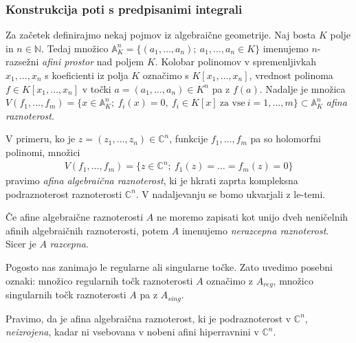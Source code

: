 \documentclass[12pt,a4paper,twoside]{article}
\theoremstyle{definition} %
\theoremstyle{plain} %
\numberwithin{equation}{section}  %
\begin{document}
\subsubsection{Konstrukcija poti s predpisanimi integrali}
%
Za začetek definirajmo nekaj pojmov iz algebraične geometrije. \newline
Naj bosta $K$ polje in $n \in \mathbb{N}$. Tedaj množico $\mathbb{A}_{K}^{n} = \{ (a_{1}, \dots , a_{n}); \ a_{1}, \dots , a_{n} \in K \}$ imenujemo $n$-razsežni \emph{afini prostor} nad poljem $K$.
Kolobar polinomov v spremenljivkah $x_{1}, \dots , x_{n}$ s koeficienti iz polja $K$ označimo s $K[x_{1}, \dots , x_{n}]$, vrednost polinoma $f \in K[x_{1}, \dots , x_{n}]$ v točki $a = (a_{1}, \dots , a_{n}) \in K^{n}$ pa z $f(a)$.
Nadalje je množica $V(f_{1}, \dots , f_{m}) = \{ x \in \mathbb{A}_{K}^{n} ; \ f_{i}(x) = 0, \ f_{i} \in K[x] \ \textrm{za vse} \ i = 1, \dots , m \} \subset \mathbb{A}_{K}^{n}$ \emph{afina raznoterost}.

V primeru, ko je $z = (z_{1}, \dots , z_{n}) \in \mathbb{C}^{n}$, funkcije $f_{1}, \dots , f_{m}$ pa so holomorfni polinomi, množici
\begin{gather}
V(f_{1}, \dots , f_{m}) = \{ z \in \mathbb{C}^{n}; \ f_{1}(z) = \dots = f_{m}(z) = 0 \}
\end{gather}
pravimo \emph{afina algebraična raznoterost}, ki je hkrati zaprta kompleksna podraznoterost raznoterosti $\mathbb{C}^{n}$.
V nadaljevanju se bomo ukvarjali z le-temi.

Če afine algebraične raznoterosti $A$ ne moremo zapisati kot unijo dveh neničelnih afinih algebraičnih raznoterosti, potem $A$ imenujemo \emph{nerazcepna raznoterost}.
Sicer je $A$ \emph{razcepna}.

Pogosto nas zanimajo le regularne ali singularne točke. Zato uvedimo posebni oznaki:
množico regularnih točk raznoterosti $A$ označimo z $A_{reg}$, množico singularnih točk raznoterosti $A$ pa z $A_{sing}$.

Pravimo, da je afina algebraična raznoterost, ki je podraznoterost v $\mathbb{C}^{n}$, \emph{neizrojena}, kadar ni vsebovana v nobeni afini hiperravnini v $\mathbb{C}^{n}$.
\end{document}
